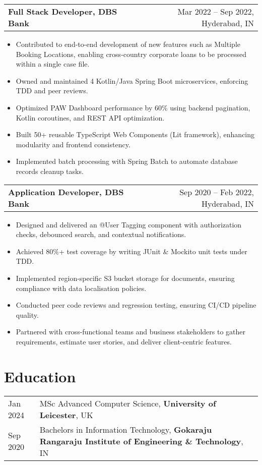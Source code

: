 \documentclass[a4paper,12pt]{article}
\makeatletter
\newenvironment{joblong}[2]
    {
    \begin{tabularx}{\linewidth}{@{}l X r@{}}
    \textbf{#1} & &  #2 \\
    \end{tabularx}
    \begin{minipage}[t]{\linewidth}
    \begin{itemize}[nosep,after=\strut, leftmargin=1em, itemsep=3pt,label=--]
    }
    {
    \end{itemize}
    \end{minipage}    
    }
\makeatother
\begin{document}
\begin{joblong}{Full Stack Developer, DBS Bank}{Mar 2022 -- Sep 2022, Hyderabad, IN}
\item Contributed to end-to-end development of new features such as Multiple Booking Locations, enabling cross-country corporate loans to be processed within a single case file.
\item Owned and maintained 4 Kotlin/Java Spring Boot microservices, enforcing TDD and peer reviews.
\item Optimized PAW Dashboard performance by 60\% using backend pagination, Kotlin coroutines, and REST API optimization.
\item Built 50+ reusable TypeScript Web Components (Lit framework), enhancing modularity and frontend consistency.
\item Implemented batch processing with Spring Batch to automate database records cleanup tasks.
\end{joblong}

\begin{joblong}{Application Developer, DBS Bank}{Sep 2020 -- Feb 2022, Hyderabad, IN}
\item Designed and delivered an @User Tagging component with authorization checks, debounced search, and contextual notifications.
\item Achieved 80\%+ test coverage by writing JUnit & Mockito unit tests under TDD.
\item Implemented region-specific S3 bucket storage for documents, ensuring compliance with data localisation policies.
\item Conducted peer code reviews and regression testing, ensuring CI/CD pipeline quality.
\item Partnered with cross-functional teams and business stakeholders to gather requirements, estimate user stories, and deliver client-centric features.
\end{joblong}

\section{Education}
\begin{tabularx}{\linewidth}{@{}l X@{}} 	
Jan 2024 & MSc Advanced Computer Science, \textbf{University of Leicester}, UK \\
Sep 2020 & Bachelors in Information Technology, \textbf{Gokaraju Rangaraju Institute of Engineering \& Technology}, IN \\
\end{tabularx}
\end{document}
